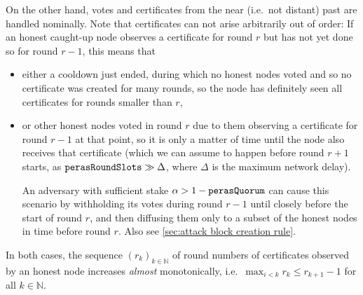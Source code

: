 On the other hand, votes and certificates from the near (i.e.\ not distant) past are handled nominally.
Note that certificates can not arise arbitrarily out of order:
If an honest caught-up node observes a certificate for round $r$ but has not yet done so for round $r-1$, this means that
\begin{itemize}
\item
  either a cooldown just ended, during which no honest nodes voted and so no certificate was created for many rounds, so the node has definitely seen all certificates for rounds smaller than $r$,
\item
  or other honest nodes voted in round $r$ due to them observing a certificate for round $r-1$ at that point, so it is only a matter of time until the node also receives that certificate (which we can assume to happen before round $r+1$ starts, as $\mathtt{perasRoundSlots} \gg \Delta$, where $\Delta$ is the maximum network delay).

  An adversary with sufficient stake $\alpha > 1-\mathtt{perasQuorum}$ can cause this scenario by withholding its votes during round $r-1$ until closely before the start of round $r$, and then diffusing them only to a subset of the honest nodes in time before round $r$.
  Also see \cref{sec:attack block creation rule}.
\end{itemize}
In both cases, the sequence ${(r_k)}_{k\in\mathbb{N}}$ of round numbers of certificates observed by an honest node increases \emph{almost} monotonically, i.e.\ $\max_{i<k} r_k \le  r_{k+1} - 1$ for all $k\in\mathbb{N}$.

